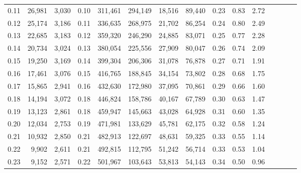 \begin{tabular}{rrrcrrrrrrrrrrr}
0.11 &  26,981 &  3,030 &                                       0.10 &  311,461 &  294,149 &   18,516 &   89,440 &  0.23 &  0.83 &                         2.72 \\
0.12 &  25,174 &  3,186 &                                       0.11 &  336,635 &  268,975 &   21,702 &   86,254 &  0.24 &  0.80 &                         2.49 \\
0.13 &  22,685 &  3,183 &                                       0.12 &  359,320 &  246,290 &   24,885 &   83,071 &  0.25 &  0.77 &                         2.28 \\
0.14 &  20,734 &  3,024 &                                       0.13 &  380,054 &  225,556 &   27,909 &   80,047 &  0.26 &  0.74 &                         2.09 \\
0.15 &  19,250 &  3,169 &                                       0.14 &  399,304 &  206,306 &   31,078 &   76,878 &  0.27 &  0.71 &                         1.91 \\
0.16 &  17,461 &  3,076 &                                       0.15 &  416,765 &  188,845 &   34,154 &   73,802 &  0.28 &  0.68 &                         1.75 \\
0.17 &  15,865 &  2,941 &                                       0.16 &  432,630 &  172,980 &   37,095 &   70,861 &  0.29 &  0.66 &                         1.60 \\
0.18 &  14,194 &  3,072 &                                       0.18 &  446,824 &  158,786 &   40,167 &   67,789 &  0.30 &  0.63 &                         1.47 \\
0.19 &  13,123 &  2,861 &                                       0.18 &  459,947 &  145,663 &   43,028 &   64,928 &  0.31 &  0.60 &                         1.35 \\
0.20 &  12,034 &  2,753 &                                       0.19 &  471,981 &  133,629 &   45,781 &   62,175 &  0.32 &  0.58 &                         1.24 \\
0.21 &  10,932 &  2,850 &                                       0.21 &  482,913 &  122,697 &   48,631 &   59,325 &  0.33 &  0.55 &                         1.14 \\
0.22 &   9,902 &  2,611 &                                       0.21 &  492,815 &  112,795 &   51,242 &   56,714 &  0.33 &  0.53 &                         1.04 \\
0.23 &   9,152 &  2,571 &                                       0.22 &  501,967 &  103,643 &   53,813 &   54,143 &  0.34 &  0.50 &                         0.96 \\

\end{tabular}
